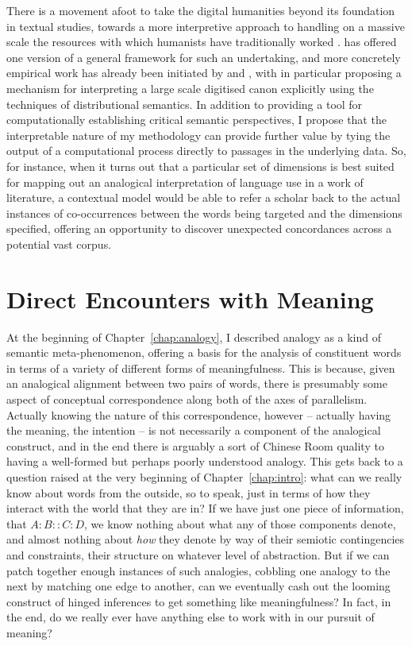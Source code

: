 There is a movement afoot to take the digital humanities beyond its foundation in textual studies, towards a more interpretive approach to handling on a massive scale the resources with which humanists have traditionally worked \citep[see][for an interesting discussion]{AllingtonEA2016}.  \cite{Moretti2013} has offered one version of a general framework for such an undertaking, and more concretely empirical work has already been initiated by \cite{HopeEA2010} and \cite{Ahnert2015}, with \citeauthor{HopeEA2010} in particular proposing a mechanism for interpreting a large scale digitised canon explicitly using the techniques of distributional semantics.  In addition to providing a tool for computationally establishing critical semantic perspectives, I propose that the interpretable nature of my methodology can provide further value by tying the output of a computational process directly to passages in the underlying data.  So, for instance, when it turns out that a particular set of dimensions is best suited for mapping out an analogical interpretation of language use in a work of literature, a contextual model would be able to refer a scholar back to the actual instances of co-occurrences between the words being targeted and the dimensions specified, offering an opportunity to discover unexpected concordances across a potential vast corpus.

\section{Direct Encounters with Meaning}
At the beginning of Chapter~\ref{chap:analogy}, I described analogy as a kind of semantic meta-phenomenon, offering a basis for the analysis of constituent words in terms of a variety of different forms of meaningfulness.  This is because, given an analogical alignment between two pairs of words, there is presumably some aspect of conceptual correspondence along both of the axes of parallelism.  Actually knowing the nature of this correspondence, however -- actually having the meaning, the intention -- is not necessarily a component of the analogical construct, and in the end there is arguably a sort of Chinese Room \citep{Searle1980} quality to having a well-formed but perhaps poorly understood analogy.  This gets back to a question raised at the very beginning of Chapter~\ref{chap:intro}: what can we really know about words from the outside, so to speak, just in terms of how they interact with the world that they are in?  If we have just one piece of information, that $A:B::C:D$, we know nothing about what any of those components denote, and almost nothing about \emph{how} they denote by way of their semiotic contingencies and constraints, their structure on whatever level of abstraction.  But if we can patch together enough instances of such analogies, cobbling one analogy to the next by matching one edge to another, can we eventually cash out the looming construct of hinged inferences to get something like meaningfulness?  In fact, in the end, do we really ever have anything else to work with in our pursuit of meaning?

